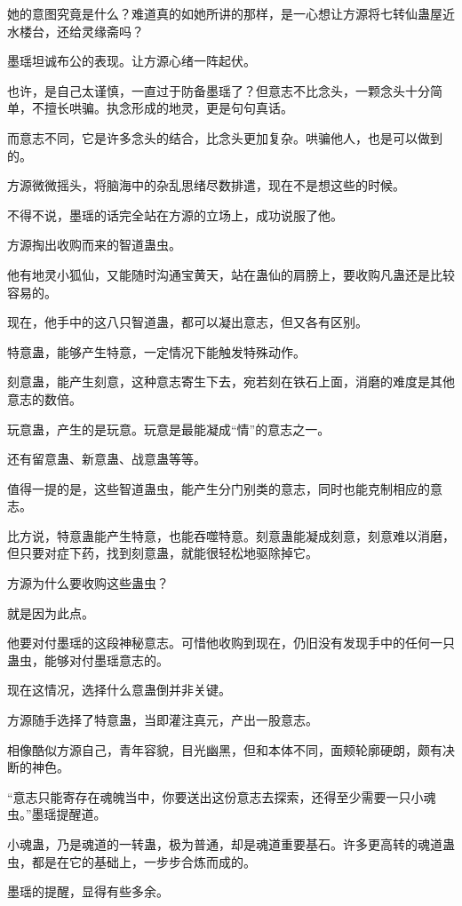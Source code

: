 \begin{this_body}
她的意图究竟是什么？难道真的如她所讲的那样，是一心想让方源将七转仙蛊屋近水楼台，还给灵缘斋吗？

墨瑶坦诚布公的表现。让方源心绪一阵起伏。

也许，是自己太谨慎，一直过于防备墨瑶了？但意志不比念头，一颗念头十分简单，不擅长哄骗。执念形成的地灵，更是句句真话。

而意志不同，它是许多念头的结合，比念头更加复杂。哄骗他人，也是可以做到的。

方源微微摇头，将脑海中的杂乱思绪尽数排遣，现在不是想这些的时候。

不得不说，墨瑶的话完全站在方源的立场上，成功说服了他。

方源掏出收购而来的智道蛊虫。

他有地灵小狐仙，又能随时沟通宝黄天，站在蛊仙的肩膀上，要收购凡蛊还是比较容易的。

现在，他手中的这八只智道蛊，都可以凝出意志，但又各有区别。

特意蛊，能够产生特意，一定情况下能触发特殊动作。

刻意蛊，能产生刻意，这种意志寄生下去，宛若刻在铁石上面，消磨的难度是其他意志的数倍。

玩意蛊，产生的是玩意。玩意是最能凝成“情”的意志之一。

还有留意蛊、新意蛊、战意蛊等等。

值得一提的是，这些智道蛊虫，能产生分门别类的意志，同时也能克制相应的意志。

比方说，特意蛊能产生特意，也能吞噬特意。刻意蛊能凝成刻意，刻意难以消磨，但只要对症下药，找到刻意蛊，就能很轻松地驱除掉它。

方源为什么要收购这些蛊虫？

就是因为此点。

他要对付墨瑶的这段神秘意志。可惜他收购到现在，仍旧没有发现手中的任何一只蛊虫，能够对付墨瑶意志的。

现在这情况，选择什么意蛊倒并非关键。

方源随手选择了特意蛊，当即灌注真元，产出一股意志。

相像酷似方源自己，青年容貌，目光幽黑，但和本体不同，面颊轮廓硬朗，颇有决断的神色。

“意志只能寄存在魂魄当中，你要送出这份意志去探索，还得至少需要一只小魂虫。”墨瑶提醒道。

小魂蛊，乃是魂道的一转蛊，极为普通，却是魂道重要基石。许多更高转的魂道蛊虫，都是在它的基础上，一步步合炼而成的。

墨瑶的提醒，显得有些多余。


\end{this_body}
